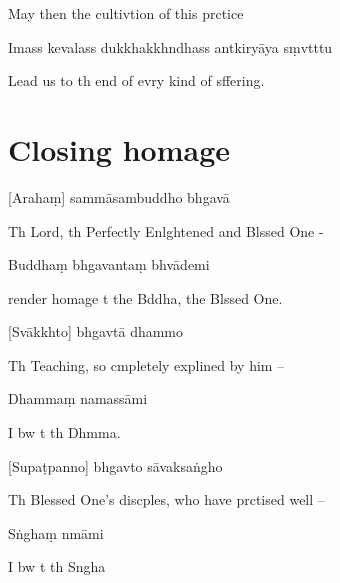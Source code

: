 \begin{english}
  May then the cultivtion of this prctice
\end{english}

Imass kevalass dukkhakkhndhass antkiryāya sṃvtttu

\begin{english}
  Lead us to th end of evry kind of sffering.
\end{english}

\chapter[Closing homage]{Closing homage}

[Arahaṃ] sammāsambuddho bhgavā

\begin{english}
  Th Lord, th Perfectly Enlghtened and Blssed One -
\end{english}

Buddhaṃ bhgavantaṃ bhvādemi

\begin{english}
   render homage t the Bddha, the Blssed One.
\end{english}


[Svākkhto] bhgavtā dhammo

\begin{english}
  Th Teaching, so cmpletely explined by him --
\end{english}

Dhammaṃ namassāmi

\begin{english}
  I bw t th Dhmma.
\end{english}


[Supaṭpanno] bhgavto sāvaksaṅgho

\begin{english}
  Th Blessed One's discples, who have prctised well --
\end{english}

Sṅghaṃ nmāmi

\begin{english}
  I bw t th Sngha
\end{english}

